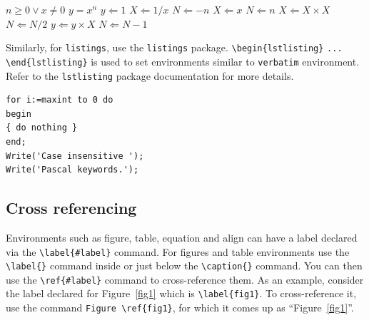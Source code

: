 \documentclass{article}
\begin{document}
\begin{algorithm}
\caption{Calculate $y = x^n$}\label{algo1}
\begin{algorithmic}[1]
\Require $n \geq 0 \vee x \neq 0$
\Ensure $y = x^n$ 
\State $y \Leftarrow 1$
\label{algln2}
        \State $X \Leftarrow 1 / x$
        \State $N \Leftarrow -n$
\Else
        \State $X \Leftarrow x$
        \State $N \Leftarrow n$
\EndIf
{}
            \State $X \Leftarrow X \times X$
            \State $N \Leftarrow N / 2$
        \Else[$N$ is odd]
            \State $y \Leftarrow y \times X$
            \State $N \Leftarrow N - 1$
        \EndIf
\EndWhile
\end{algorithmic}
\end{algorithm}
\bigskip

Similarly, for \verb+listings+, use the \verb+listings+ package. \verb+\begin{lstlisting}+ \verb+...+ \verb+\end{lstlisting}+ is used to set environments similar to \verb+verbatim+ environment. Refer to the \verb+lstlisting+ package documentation for more details.

\bigskip
\begin{minipage}{\hsize}%
\lstset{frame=single,framexleftmargin=-1pt,framexrightmargin=-17pt,framesep=12pt,linewidth=0.98\textwidth,language=pascal}%
\begin{lstlisting}
for i:=maxint to 0 do
begin
{ do nothing }
end;
Write('Case insensitive ');
Write('Pascal keywords.');
\end{lstlisting}
\end{minipage}

\subsection{Cross referencing}\label{sec8}

Environments such as figure, table, equation and align can have a label
declared via the \verb+\label{#label}+ command. For figures and table
environments use the \verb+\label{}+ command inside or just
below the \verb+\caption{}+ command. You can then use the
\verb+\ref{#label}+ command to cross-reference them. As an example, consider
the label declared for Figure~\ref{fig1} which is
\verb+\label{fig1}+. To cross-reference it, use the command 
\verb+Figure \ref{fig1}+, for which it comes up as
``Figure~\ref{fig1}''. 
\end{document}
